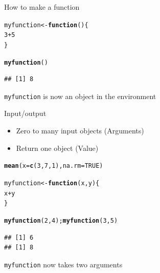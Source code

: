 \documentclass{beamer}\usepackage[]{graphicx}\usepackage[]{color}
\makeatletter
\newcommand{\hlnum}[1]{\textcolor[rgb]{0.686,0.059,0.569}{#1}}%
\newcommand{\hlopt}[1]{\textcolor[rgb]{0,0,0}{#1}}%
\newcommand{\hlstd}[1]{\textcolor[rgb]{0.345,0.345,0.345}{#1}}%
\newcommand{\hlkwa}[1]{\textcolor[rgb]{0.161,0.373,0.58}{\textbf{#1}}}%
\newcommand{\hlkwb}[1]{\textcolor[rgb]{0.69,0.353,0.396}{#1}}%
\newcommand{\hlkwc}[1]{\textcolor[rgb]{0.333,0.667,0.333}{#1}}%
\newcommand{\hlkwd}[1]{\textcolor[rgb]{0.737,0.353,0.396}{\textbf{#1}}}%
\newenvironment{kframe}{%
 \def\at@end@of@kframe{}%
 \ifinner\ifhmode%
  \def\at@end@of@kframe{\end{minipage}}%
  \begin{minipage}{\columnwidth}%
 \fi\fi%
 \def\FrameCommand##1{\hskip\@totalleftmargin \hskip-\fboxsep
 \colorbox{shadecolor}{##1}\hskip-\fboxsep
     \hskip-\linewidth \hskip-\@totalleftmargin \hskip\columnwidth}%
 \MakeFramed {\advance\hsize-\width
   \@totalleftmargin\z@ \linewidth\hsize
   \@setminipage}}%
 {\par\unskip\endMakeFramed%
 \at@end@of@kframe}
\newenvironment{knitrout}{}{} %
\makeatother
\begin{document}
\begin{frame}[fragile]{How to make a function}

\begin{knitrout}
\color{fgcolor}\begin{kframe}
\begin{alltt}
\hlstd{myfunction} \hlkwb{<-} \hlkwa{function}\hlstd{()\{}
  \hlnum{3}\hlopt{+}\hlnum{5}
\hlstd{\}}

\hlkwd{myfunction}\hlstd{()}
\end{alltt}
\begin{verbatim}
## [1] 8
\end{verbatim}
\end{kframe}
\end{knitrout}

\texttt{myfunction} is now an object in the environment
\end{frame}

\begin{frame}[fragile]{Input/output}

\begin{block}{}
  \begin{itemize}
  \item Zero to many input objects (Arguments)
  \item Return one object (Value)
  \end{itemize}
\end{block}

\begin{knitrout}
\color{fgcolor}\begin{kframe}
\begin{alltt}
  \hlkwd{mean}\hlstd{(}\hlkwc{x} \hlstd{=} \hlkwd{c}\hlstd{(}\hlnum{3}\hlstd{,}\hlnum{7}\hlstd{,}\hlnum{1}\hlstd{),} \hlkwc{na.rm} \hlstd{=} \hlnum{TRUE}\hlstd{)}
\end{alltt}
\end{kframe}
\end{knitrout}

\pause
\begin{knitrout}
\color{fgcolor}\begin{kframe}
\begin{alltt}
\hlstd{myfunction} \hlkwb{<-} \hlkwa{function}\hlstd{(}\hlkwc{x}\hlstd{,} \hlkwc{y}\hlstd{)\{}
  \hlstd{x}\hlopt{+}\hlstd{y}
\hlstd{\}}

\hlkwd{myfunction}\hlstd{(}\hlnum{2}\hlstd{,} \hlnum{4}\hlstd{);} \hlkwd{myfunction}\hlstd{(}\hlnum{3}\hlstd{,} \hlnum{5}\hlstd{)}
\end{alltt}
\begin{verbatim}
## [1] 6
## [1] 8
\end{verbatim}
\end{kframe}
\end{knitrout}

\texttt{myfunction} now takes two arguments

\end{frame}
\end{document}
